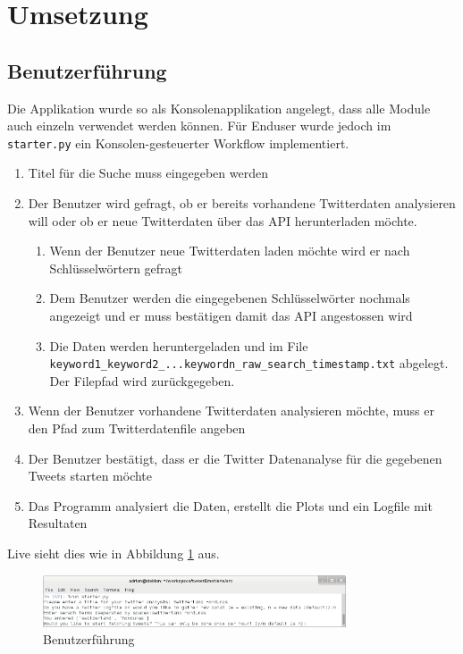 \clearpage
\section{Umsetzung}
\subsection{Benutzerführung}
Die Applikation wurde so als Konsolenapplikation angelegt, dass alle Module auch einzeln verwendet werden können. Für Enduser wurde jedoch im \lstinline$starter.py$ ein Konsolen-gesteuerter Workflow implementiert.

\begin{enumerate}
	\item Titel für die Suche muss eingegeben werden
	\item Der Benutzer wird gefragt, ob er bereits vorhandene Twitterdaten analysieren will oder ob er neue Twitterdaten über das API herunterladen möchte.
	\begin{enumerate}
		\item Wenn der Benutzer neue Twitterdaten laden möchte wird er nach Schlüsselwörtern gefragt
		\item Dem Benutzer werden die eingegebenen Schlüsselwörter nochmals angezeigt und er muss bestätigen damit das API angestossen wird
		\item Die Daten werden heruntergeladen und im File \lstinline$keyword1_keyword2_...keywordn_raw_search_timestamp.txt$ abgelegt. Der Filepfad wird zurückgegeben.
	\end{enumerate}
	\item Wenn der Benutzer vorhandene Twitterdaten analysieren möchte, muss er den Pfad zum Twitterdatenfile angeben
	\item Der Benutzer bestätigt, dass er die Twitter Datenanalyse für die gegebenen Tweets starten möchte
	\item Das Programm analysiert die Daten, erstellt die Plots und ein Logfile mit Resultaten
\end{enumerate}

Live sieht dies wie in Abbildung \ref{fig:benutzerfuehrung} aus.

\begin{figure}[h]
  \centering
  \includegraphics[width=0.8\textwidth]{images/benutzerfuehrung.png}
  \caption[Benutzerführung]{Benutzerführung}
  \label{fig:benutzerfuehrung}
\end{figure}

